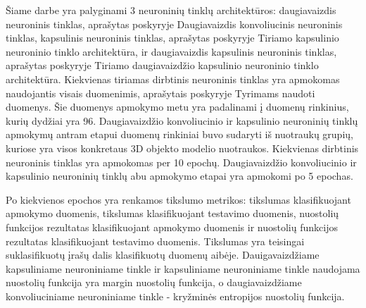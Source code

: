 
Šiame darbe yra palyginami 3 neuroninių tinklų architektūros: daugiavaizdis neuroninis tinklas, aprašytas poskyryje Daugiavaizdis konvoliucinis neuroninis tinklas, kapsulinis neuroninis tinklas, aprašytas poskyryje Tiriamo kapsulinio neuroninio tinklo architektūra, ir daugiavaizdis kapsulinis neuroninis tinklas, aprašytas poskyryje Tiriamo daugiavaizdžio kapsulinio neuroninio tinklo architektūra. Kiekvienas tiriamas dirbtinis neuroninis tinklas yra apmokomas naudojantis visais duomenimis, aprašytais poskyryje Tyrimams naudoti duomenys. Šie duomenys apmokymo metu yra padalinami į duomenų rinkinius, kurių dydžiai yra 96. Daugiavaizdžio konvoliucinio ir kapsulinio neuroninių tinklų apmokymų antram etapui duomenų rinkiniai buvo sudaryti iš nuotraukų grupių, kuriose yra visos konkretaus 3D objekto modelio nuotraukos. Kiekvienas dirbtinis neuroninis tinklas yra apmokomas per 10 epochų. Daugiavaizdžio konvoliucinio ir kapsulinio neuroninių tinklų abu apmokymo etapai yra apmokomi po 5 epochas.

Po kiekvienos epochos yra renkamos tikslumo metrikos: tikslumas klasifikuojant apmokymo duomenis, tikslumas klasifikuojant testavimo duomenis, nuostolių funkcijos rezultatas klasifikuojant apmokymo duomenis ir nuostolių funkcijos rezultatas klasifikuojant testavimo duomenis. Tikslumas yra teisingai suklasifikuotų įrašų dalis klasifikuotų duomenų aibėje. Dauigavaizdžiame kapsuliniame neuroniniame tinkle ir kapsuliniame neuroniniame tinkle naudojama nuostolių funkcija yra margin nuostolių funkcija, o daugiavaizdžiame konvoliuciniame neuroniniame tinkle - kryžminės entropijos nuostolių funkcija.

